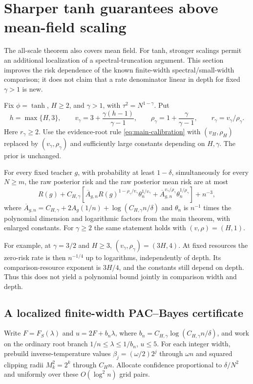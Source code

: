 \section{Sharper tanh guarantees above mean-field scaling}
\label{sec:above-one}
The all-scale theorem also covers mean field. For tanh, stronger scalings permit an additional localization of a spectral-truncation argument. This section improves the risk dependence of the known finite-width spectral/small-width comparison; it does not claim that a rate denominator linear in depth for fixed $\gamma>1$ is new.

Fix $\phi=\tanh$, $H\ge2$, and $\gamma>1$, with $\tau^2=N^{1-\gamma}$. Put
\begin{equation}
 h=\max\{H,3\},\qquad
 v_\gamma=3+\frac{\gamma(h-1)}{\gamma-1},\qquad
 \rho_\gamma=1+\frac\gamma{\gamma-1},\qquad r_\gamma=v_\gamma/\rho_\gamma.
 \label{eq:gamma-powers}
\end{equation}
Here $r_\gamma\ge2$. Use the evidence-root rule \eqref{eq:main-calibration} with $(v_H,\rho_H)$ replaced by $(v_\gamma,\rho_\gamma)$ and sufficiently large constants depending on $H,\gamma$. The prior is unchanged.

\begin{theorem}
\label{thm:above-one}
For every fixed teacher $g$, with probability at least $1-\delta$, simultaneously for every $N\ge m$, the raw posterior risk and the raw posterior mean risk are at most
\begin{equation}
 R(g)+C_{H,\gamma}\left[
 \overline A_{g,n}R(g)^{1-\rho_\gamma/v_\gamma}
           \theta_n^{1/v_\gamma}
 +\overline A_{g,n}^{v_\gamma/\rho_\gamma}
           \theta_n^{1/\rho_\gamma}\right]+n^{-3},
 \label{eq:above-one-oracle}
\end{equation}
where $\overline A_{g,n}=C_{H,\gamma}+2A_g(1/n)+\log(C_{H,\gamma}n/\delta)$ and $\theta_n$ is $n^{-1}$ times the polynomial dimension and logarithmic factors from the main theorem, with enlarged constants. For $\gamma\ge2$ the same statement holds with $(v,\rho)=(H,1)$.
\end{theorem}

For example, at $\gamma=3/2$ and $H\ge3$, $(v_\gamma,\rho_\gamma)=(3H,4)$. At fixed resources the zero-risk rate is then $n^{-1/4}$ up to logarithms, independently of depth. Its comparison-resource exponent is $3H/4$, and the constants still depend on depth. Thus this does not yield a polynomial bound jointly in comparison width and depth.

\subsection{A localized finite-width PAC--Bayes certificate}
Write $F=F_S(\lambda)$ and $u=2F+b_n\lambda$, where
$b_n=C_{H,\gamma}\log(C_{H,\gamma}n/\delta)$, and work on the ordinary root branch $1/n\le\lambda\le1/b_n$, $u\le5$.
For each integer width, prebuild inverse-temperature values $\beta_j=(\omega/2)2^j$ through $\omega n$ and squared clipping radii $M_k^2=2^k$ through $C_H n$. Allocate confidence proportional to $\delta/N^2$ and uniformly over these $O(\log^2 n)$ grid pairs.

